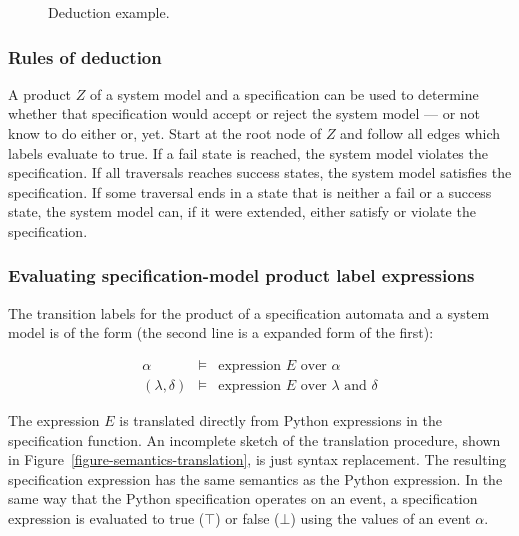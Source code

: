 \documentclass[a4paper,11pt]{kth-mag}
\begin{document}
\begin{figure}[h!]
  \caption{Deduction example.}
	\label{figure-deduction-example}
\end{figure}


\subsubsection{Rules of deduction}

A product $Z$ of a system model and a specification can be used to determine
whether that specification would accept or reject the system model --- or not
know to do either or, yet. Start at the root node of $Z$ and follow all edges
which labels evaluate to true. If a fail state is reached, the system model
violates the specification. If all traversals reaches success states, the
system model satisfies the specification. If some traversal ends in a state
that is neither a fail or a success state, the system model can, if it were
extended, either satisfy or violate the specification.


\subsubsection{Evaluating specification-model product label expressions}

The transition labels for the product of a specification automata and a system
model is of the form (the second line is a expanded form of the first):

\medskip
\[
  \begin{array}{rcl}
    \alpha & \models & \text{expression $E$ over $\alpha$} \\
    (\lambda, \delta) & \models & \text{expression $E$ over $\lambda$ and $\delta$}
  \end{array}
\]
\medskip

The expression $E$ is translated directly from Python expressions in the
specification function. An incomplete sketch of the translation procedure,
shown in Figure~\ref{figure-semantics-translation}, is just syntax replacement.
The resulting specification expression has the same semantics as the Python
expression. In the same way that the Python specification operates on an event,
a specification expression is evaluated to true ($\top$) or false ($\bot$)
using the values of an event $\alpha$.
\end{document}
